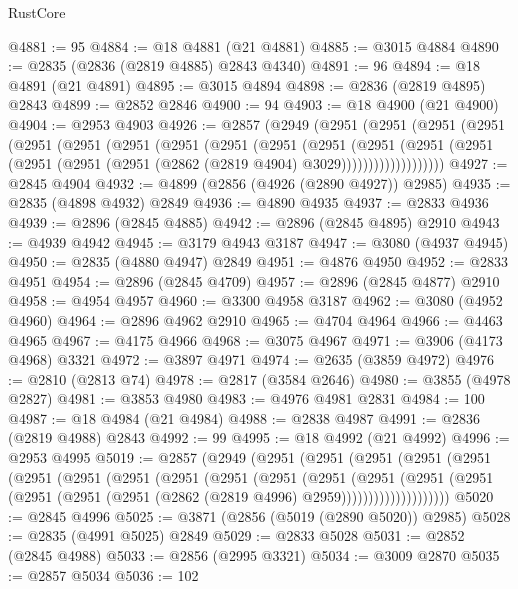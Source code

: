 \begin{lexlean}{RustCore}
\begin{coremodule}
@4881 := 95
@4884 := @18 @4881 (@21 @4881)
@4885 := @3015 @4884
@4890 := @2835 (@2836 (@2819 @4885) @2843 @4340)
@4891 := 96
@4894 := @18 @4891 (@21 @4891)
@4895 := @3015 @4894
@4898 := @2836 (@2819 @4895) @2843
@4899 := @2852 @2846
@4900 := 94
@4903 := @18 @4900 (@21 @4900)
@4904 := @2953 @4903
@4926 := @2857
    (@2949
      (@2951
        (@2951
          (@2951
            (@2951
              (@2951
                (@2951
                  (@2951
                    (@2951
                      (@2951
                        (@2951
                          (@2951
                            (@2951
                              (@2951
                                (@2951
                                  (@2951 (@2951 (@2951 (@2862 (@2819 @4904) @3029)))))))))))))))))))
@4927 := @2845 @4904
@4932 := @4899 (@2856 (@4926 (@2890 @4927)) @2985)
@4935 := @2835 (@4898 @4932) @2849
@4936 := @4890 @4935
@4937 := @2833 @4936
@4939 := @2896 (@2845 @4885)
@4942 := @2896 (@2845 @4895) @2910
@4943 := @4939 @4942
@4945 := @3179 @4943 @3187
@4947 := @3080 (@4937 @4945)
@4950 := @2835 (@4880 @4947) @2849
@4951 := @4876 @4950
@4952 := @2833 @4951
@4954 := @2896 (@2845 @4709)
@4957 := @2896 (@2845 @4877) @2910
@4958 := @4954 @4957
@4960 := @3300 @4958 @3187
@4962 := @3080 (@4952 @4960)
@4964 := @2896 @4962 @2910
@4965 := @4704 @4964
@4966 := @4463 @4965
@4967 := @4175 @4966
@4968 := @3075 @4967
@4971 := @3906 (@4173 @4968) @3321
@4972 := @3897 @4971
@4974 := @2635 (@3859 @4972)
@4976 := @2810 (@2813 @74)
@4978 := @2817 (@3584 @2646)
@4980 := @3855 (@4978 @2827)
@4981 := @3853 @4980
@4983 := @4976 @4981 @2831
@4984 := 100
@4987 := @18 @4984 (@21 @4984)
@4988 := @2838 @4987
@4991 := @2836 (@2819 @4988) @2843
@4992 := 99
@4995 := @18 @4992 (@21 @4992)
@4996 := @2953 @4995
@5019 := @2857
    (@2949
      (@2951
        (@2951
          (@2951
            (@2951
              (@2951
                (@2951
                  (@2951
                    (@2951
                      (@2951
                        (@2951
                          (@2951
                            (@2951
                              (@2951
                                (@2951
                                  (@2951
                                    (@2951
                                      (@2951 (@2951 (@2862 (@2819 @4996) @2959))))))))))))))))))))
@5020 := @2845 @4996
@5025 := @3871 (@2856 (@5019 (@2890 @5020)) @2985)
@5028 := @2835 (@4991 @5025) @2849
@5029 := @2833 @5028
@5031 := @2852 (@2845 @4988)
@5033 := @2856 (@2995 @3321)
@5034 := @3009 @2870
@5035 := @2857 @5034
@5036 := 102

\end{coremodule}
\end{lexlean}
